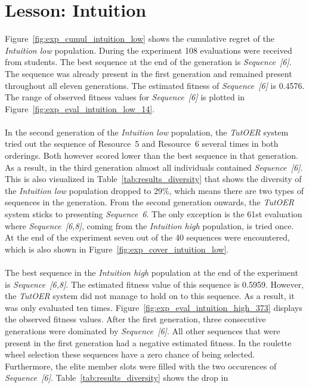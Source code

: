 \section{Lesson: Intuition}
\label{sec:results_intuition}
Figure~\ref{fig:exp_cumul_intuition_low} shows the cumulative regret of the
\emph{Intuition low} population. During the experiment 108 evaluations were
received from students. The best sequence at the end of the generation is
\emph{Sequence~[6]}. The sequence was already present in the first generation
and remained present throughout all eleven generations. The estimated fitness of
\emph{Sequence~[6]} is 0.4576. The range of observed fitness values for
\emph{Sequence~[6]} is plotted in Figure~\ref{fig:exp_eval_intuition_low_14}.
\\\\
\noindent
In the second generation of the \emph{Intuition low} population, the
\emph{TutOER} system tried out the sequence of Resource~5 and Resource~6
several times in both orderings. Both however scored lower than the best
sequence in that generation. As a result, in the third generation almost all
individuals contained \emph{Sequence~[6]}. This is also visualized in
Table~\ref{tab:results_diversity} that shows the diversity of the
\emph{Intuition low} population dropped to 29\%, which means there are two
types of sequences in the generation. From the second generation onwards, the
\emph{TutOER} system sticks to presenting \emph{Sequence~6}. The only exception
is the 61st evaluation where \emph{Sequence~[6,8]}, coming from the
\emph{Intuition high} population, is tried once. At the end of the experiment
seven out of the 40 sequences were encountered, which is also shown in
Figure~\ref{fig:exp_cover_intuition_low}.\\\\
\noindent
The best sequence in the \emph{Intuition high}
population at the end of the experiment is \emph{Sequence~[6,8]}. The estimated
fitness value of this sequence is 0.5959. However, the \emph{TutOER} system did
not manage to hold on to this sequence. As a result, it was only evaluated ten
times. Figure~\ref{fig:exp_eval_intuition_high_373} displays the observed
fitness values. After the first generation, three consecutive generations were
dominated by \emph{Sequence~[6]}. All other sequences that were present in the
first generation had a negative estimated fitness. In the roulette wheel
selection these sequences have a zero chance of being selected. Furthermore,
the elite member slots were filled with the two occurences of
\emph{Sequence~[6]}. Table~\ref{tab:results_diversity} shows the drop in

